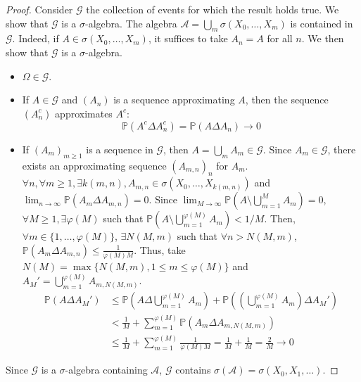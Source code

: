 \begin{proof}
Consider $\mathcal{G}$ the collection of events for which the result holds true. We show that $\mathcal{G}$ is a $\sigma$-algebra.
The algebra $\mathcal{A} = \bigcup_m \sigma(X_0, \dots, X_m)$ is contained in $\mathcal{G}$. Indeed, if $A \in \sigma(X_0, \dots, X_m)$, it suffices to take $A_n=A$ for all $n$.
We then show that $\mathcal{G}$ is a $\sigma$-algebra.
\begin{itemize}
    \item $\Omega \in \mathcal{G}$.
    \item If $A \in \mathcal{G}$ and $(A_n)$ is a sequence approximating $A$, then the sequence $(A_n^c)$ approximates $A^c$:
    \[ \mathbb{P}(A^c \Delta A_n^c) = \mathbb{P}(A \Delta A_n) \to 0 \]
    \item If $(A_m)_{m \ge 1}$ is a sequence in $\mathcal{G}$, then $A = \bigcup_m A_m \in \mathcal{G}$.
    Since $A_m \in \mathcal{G}$, there exists an approximating sequence $(A_{m,n})_n$ for $A_m$.
    $\forall n, \forall m \ge 1, \exists k(m,n), A_{m,n} \in \sigma(X_0, \dots, X_{k(m,n)})$ and $\lim_{n \to \infty} \mathbb{P}(A_m \Delta A_{m,n}) = 0$.
    Since $\lim_{M \to \infty} \mathbb{P}(A \setminus \bigcup_{m=1}^M A_m) = 0$, $\forall M \ge 1, \exists \varphi(M)$ such that $\mathbb{P}(A \setminus \bigcup_{m=1}^{\varphi(M)} A_m) < 1/M$.
    Then, $\forall m \in \{1, \dots, \varphi(M)\}$, $\exists N(M,m)$ such that $\forall n > N(M,m)$, $\mathbb{P}(A_m \Delta A_{m,n}) \le \frac{1}{\varphi(M)M}$.
    Thus, take $N(M) = \max\{N(M,m), 1 \le m \le \varphi(M)\}$ and $A_M' = \bigcup_{m=1}^{\varphi(M)} A_{m, N(M,m)}$.
    \begin{align*}
        \mathbb{P}(A \Delta A_M') &\le \mathbb{P}\left(A \Delta \bigcup_{m=1}^{\varphi(M)} A_m\right) + \mathbb{P}\left(\left(\bigcup_{m=1}^{\varphi(M)} A_m\right) \Delta A_M'\right) \\
        &< \frac{1}{M} + \sum_{m=1}^{\varphi(M)} \mathbb{P}(A_m \Delta A_{m,N(M,m)}) \\
        &\le \frac{1}{M} + \sum_{m=1}^{\varphi(M)} \frac{1}{\varphi(M)M} = \frac{1}{M} + \frac{1}{M} = \frac{2}{M} \to 0
    \end{align*}
\end{itemize}
Since $\mathcal{G}$ is a $\sigma$-algebra containing $\mathcal{A}$, $\mathcal{G}$ contains $\sigma(\mathcal{A}) = \sigma(X_0, X_1, \dots)$.
\end{proof}%
